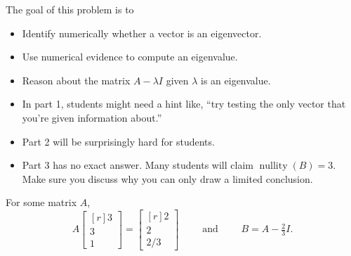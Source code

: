 \documentclass{problemset}
\DeclareMathOperator{\Nullity}{nullity}
\newcommand{\mat}[1]{\begin{bmatrix*}[r]#1\end{bmatrix*}}
\begin{document}
	\question
	\begin{annotation}
		\begin{goals}

			The goal of this problem is to
			\begin{itemize}
				\item Identify numerically whether a vector is an eigenvector.
				\item Use numerical evidence to compute an eigenvalue.
				\item Reason about the matrix $A-\lambda I$ given $\lambda$ is an eigenvalue.
			\end{itemize}
		\end{goals}

		\begin{notes}
			\begin{itemize}
				\item In part 1, students might need a hint like, ``try testing the only vector
					that you're given information about.''
				\item Part 2 will be surprisingly hard for students.
				\item Part 3 has no exact answer. Many students will claim $\Nullity(B)=3$.
					Make sure you discuss why you can only draw a limited conclusion.
			\end{itemize}
		\end{notes}
	\end{annotation}
	For some matrix $A$,
	\vspace{-.2cm}
	\[
		A\mat{3\\3\\1}=\mat{2\\2\\2/3}\qquad\text{ and }\qquad B=A-\tfrac{2}{3}I.
	\]
	\vspace{-.4cm}
\end{document}
